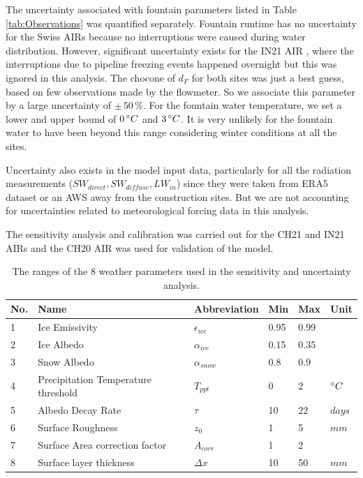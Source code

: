 \documentclass[utf8]{frontiersSCNS} %
\begin{document}
The uncertainty associated with fountain parameters listed in Table \ref{tab:Observations} was quantified
separately. Fountain runtime has no uncertainty for the Swiss AIRs because no interruptions were caused during
water distribution. However, significant uncertainty exists for the IN21 AIR , where the interruptions due to
pipeline freezing events happened overnight but this was ignored in this analysis. The chocone of $d_F$ for both
sites was just a best guess, based on few observations made by the flowmeter. So we associate this parameter by a
large uncertainty of $\pm \,50\, \%$. For the fountain water temperature, we set a lower and upper bound of $0\,
	\degree C$ and $3\, \degree C$.  It is very unlikely for the fountain water to have been beyond this range
considering winter conditions at all the sites.

Uncertainty also exists in the model input data, particularly for all the radiation measurements ($SW_{direct},
	SW_{diffuse}, LW_{in}$) since they were taken from ERA5 dataset or an AWS away from the construction sites.  But we are
not accounting for uncertainties related to meteorological forcing data in this analysis.

The sensitivity analysis and calibration was carried out for the CH21 and IN21 AIRs and the CH20 AIR was used for
validation of the model.

\begin{table}
	\centering
	\caption{The ranges of the 8 weather parameters used in the sensitivity and uncertainty analysis.}
	\label{tab:parameters}
	\begin{tabular}{@{}llllll@{}}
		\toprule
		\textbf{No.} & \textbf{Name}                       & \textbf{Abbreviation} & \textbf{Min} & \textbf{Max} & \textbf{Unit} \\\midrule
		1            & Ice Emissivity                      & $\epsilon_{ice}$      & 0.95         & 0.99         &               \\
		2            & Ice Albedo                          & $\alpha_{ice}$        & 0.15         & 0.35         &               \\
		3            & Snow Albedo                         & $\alpha_{snow}$       & 0.8          & 0.9          &               \\
		4            & Precipitation Temperature threshold & $T_{ppt}$             & 0            & 2            & $\degree C$   \\
		5            & Albedo Decay Rate                   & $\tau$                & 10           & 22           & $days$        \\
		6            & Surface Roughness                   & $z_0$                 & 1            & 5            & $mm$          \\
		7            & Surface Area correction factor      & $A_{corr}$            & 1            & 2            &               \\
		8            & Surface layer thickness             & $\Delta x$            & 10           & 50           & $mm$          \\\bottomrule
	\end{tabular}
\end{table}
\end{document}
